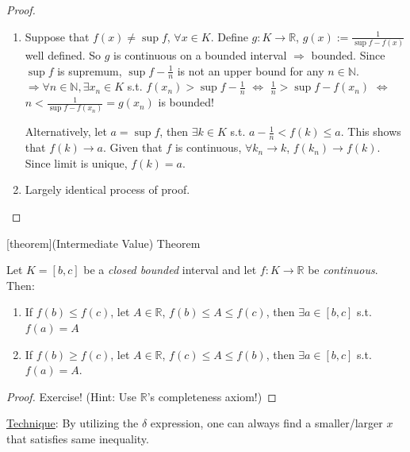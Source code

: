 \documentclass[12pt]{report}
\theoremstyle{definition}
\begin{document}
\begin{proof}
   \begin{enumerate}[label = (\arabic*)]
       \item Suppose that $f(x) \neq \sup{f}$, $\forall x \in K$.
           Define $g:K\rightarrow{}\mathbb{R}$, $g(x) := \frac{1}{\sup{f} - f(x)}$ well defined.
           So $g$ is continuous on a bounded interval $\Rightarrow{}$ bounded.
           Since $\sup{f}$ is supremum, $\sup{f} - \frac{1}{n}$ 
           is not an upper bound for any $n \in \mathbb{N}$.
           $\Rightarrow{} \forall n \in \mathbb{N}, \exists x_n \in K$ s.t. 
           $f(x_n) > \sup{f} - \frac{1}{n}$ $\iff$
           $\frac{1}{n}>\sup{f} - f(x_n)$ $\iff$
           $n < \frac{1}{\sup{f} - f(x_n)} = g(x_n)$ is bounded!

           Alternatively, let $a = \sup{f}$, then
           $\exists k \in K$ s.t. $a-\frac{1}{n} < f(k) \le a$.
           This shows that $f(k)\rightarrow a$.
           Given that $f$ is continuous, $\forall k_n \rightarrow k$,
           $f(k_n)\rightarrow f(k)$.
           Since limit is unique, $f(k)=a$.

       \item Largely identical process of proof.
   \end{enumerate}
\end{proof}

[theorem]{(Intermediate Value) Theorem}
\begin{intermediate value theorem}
    Let $K = [b,c]$ be a \emph{closed bounded} interval and let $f:K\rightarrow{}\mathbb{R}$
    be \emph{continuous}. Then:
    \begin{enumerate}
        \item If $f(b)\le f(c)$, let $A \in \mathbb{R}$, $f(b) \le A \le f(c)$,
            then $\exists a \in [b,c]$ s.t. $f(a) = A$
        \item If $f(b)\ge f(c)$, let $A \in \mathbb{R}$, $f(c) \le A \le f(b)$,
            then $\exists a \in [b,c]$ s.t. $f(a) = A$.
    \end{enumerate}
\end{intermediate value theorem}

\begin{proof}
    Exercise! (Hint: Use $\mathbb{R}$'s completeness axiom!)
\end{proof}

\underline{Technique}: By utilizing the $\delta$ expression,
one can always find a smaller/larger $x$ that satisfies same inequality.
\end{document}
